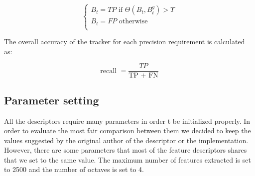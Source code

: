 \begin{equation}
\begin{cases}
B_{t} = TP  \text{ if } \Theta(B_{t}, B_t^g) > \Upsilon \\
B_{t} = FP  \text{ otherwise }\\
\end{cases}
\end{equation}

The overall accuracy of the tracker for each precision requirement is calculated as:

\begin{equation}
\text{recall } = \frac{TP}{\text{TP } + \text{ FN}}
\end{equation}


\subsection{Parameter setting}

All the descriptors require many parameters in order t be initialized properly. In order to evaluate the most fair comparison between them we decided to keep the values suggested by the original author of the descriptor or the implementation. However, there are some parameters that most of the feature descriptors shares that we set to the same value. The maximum number of features extracted is set to 2500 and the number of octaves is set to 4.



